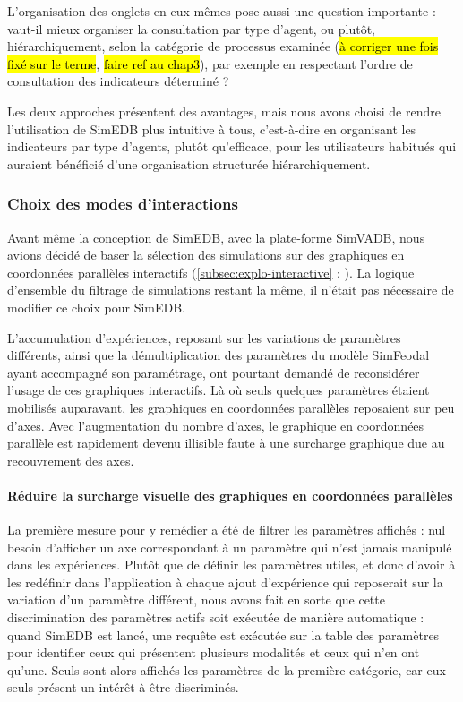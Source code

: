 L'organisation des onglets en eux-mêmes pose aussi une question importante : vaut-il mieux organiser la consultation par type d'agent, ou plutôt, hiérarchiquement, selon la catégorie de processus examinée (\hl{à corriger une fois fixé sur le terme}, \hl{faire ref au chap3}), par exemple en respectant l'ordre de consultation des indicateurs déterminé ?

Les deux approches présentent des avantages, mais nous avons choisi de rendre l'utilisation de SimEDB plus intuitive à tous, c'est-à-dire en organisant les indicateurs par type d'agents, plutôt qu'efficace, pour les utilisateurs habitués qui auraient bénéficié d'une organisation structurée hiérarchiquement.

\subsubsection{Choix des modes d'interactions}

Avant même la conception de SimEDB, avec la plate-forme SimVADB, nous avions décidé de baser la sélection des simulations sur des graphiques en coordonnées parallèles interactifs (\cref{subsec:explo-interactive} : ).
La logique d'ensemble du filtrage de simulations restant la même, il n'était pas nécessaire de modifier ce choix pour SimEDB.

L'accumulation d'expériences, reposant sur les variations de paramètres différents, ainsi que la démultiplication des paramètres du modèle SimFeodal ayant accompagné son paramétrage, ont pourtant demandé de reconsidérer l'usage de ces graphiques interactifs.
Là où seuls quelques paramètres étaient mobilisés auparavant, les graphiques en coordonnées parallèles reposaient sur peu d'axes.
Avec l'augmentation du nombre d'axes, le graphique en coordonnées parallèle est rapidement devenu illisible faute à une surcharge graphique due au recouvrement des axes.

\paragraph*{Réduire la surcharge visuelle des graphiques en coordonnées parallèles}

La première mesure pour y remédier a été de filtrer les paramètres affichés : nul besoin d'afficher un axe correspondant à un paramètre qui n'est jamais manipulé dans les expériences.
Plutôt que de définir les paramètres \og utiles\fg{}, et donc d'avoir à les redéfinir dans l'application à chaque ajout d'expérience qui reposerait sur la variation d'un paramètre différent, nous avons fait en sorte que cette discrimination des paramètres \og actifs\fg{} soit exécutée de manière automatique :
quand SimEDB est lancé, une requête est exécutée sur la table des paramètres pour identifier ceux qui présentent plusieurs modalités et ceux qui n'en ont qu'une.
Seuls sont alors affichés les paramètres de la première catégorie, car eux-seuls présent un intérêt à être discriminés.

